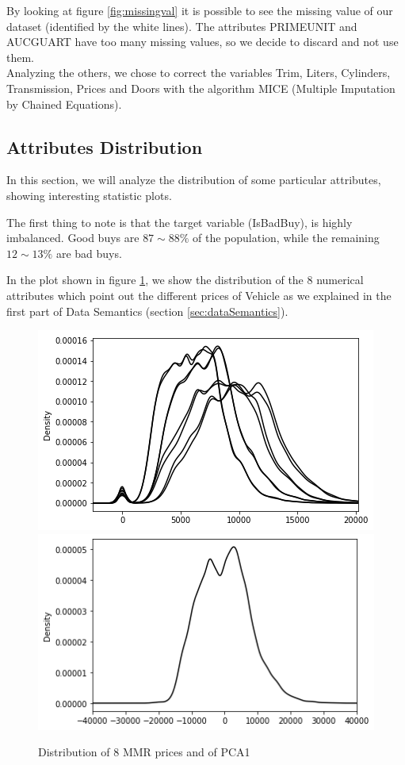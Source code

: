 \documentclass{article}
\begin{document}
	By looking at figure \ref{fig:missingval} it is possible to see the missing value of our dataset (identified by the white lines). The attributes PRIMEUNIT and AUCGUART have too many missing values, so we decide to discard and not use them.\\
	Analyzing the others, we chose to correct the variables Trim, Liters, Cylinders, Transmission, Prices and Doors with the algorithm MICE (Multiple Imputation by Chained Equations).%
	
	
	
	\subsection{Attributes Distribution}
	\label{sec:attrDistr}
	In this section, we will analyze the distribution of some particular attributes, showing interesting statistic plots.
	
	The first thing to note is that the target variable (IsBadBuy), is highly imbalanced. Good buys are $87\sim88 \%$ of the population, while the remaining $12\sim13 \%$ are bad buys.
	
	In the plot shown in figure \ref{fig:mmr}, we show the distribution of the 8 numerical attributes which point out the different prices of Vehicle as we explained in the first part of Data Semantics (section \ref{sec:dataSemantics}). 
	\begin{figure}[H]
		\centering
		\includegraphics[width=.49\textwidth]{index}\hfill
		\includegraphics[width=.49\textwidth]{PCA1}\hfill
		\caption{Distribution of 8 MMR prices and of PCA1}
		\label{fig:mmr}
	\end{figure}
	
\end{document}
